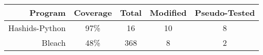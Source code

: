 \begin{table}[H]
\begin{tabular}{rcccc}
  Program & Coverage & Total & Modified & Pseudo-Tested \\
  \toprule

  Hashids-Python & 97\% & 16 & 10 & 8 \\

  Bleach & 48\% & 368 & 8 & 2 \\










\end{tabular}





\end{table}
